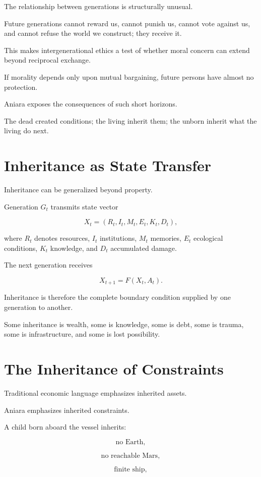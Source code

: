\documentclass[11pt,oneside]{book}
\theoremstyle{definition}
\theoremstyle{remark}
\begin{document}
The relationship between generations is structurally unusual.

Future generations cannot reward us, cannot punish us, cannot vote against us, and cannot refuse the world we construct; they receive it.

This makes intergenerational ethics a test of whether moral concern can extend beyond reciprocal exchange.

If morality depends only upon mutual bargaining, future persons have almost no protection.

Aniara exposes the consequences of such short horizons.

The dead created conditions; the living inherit them; the unborn inherit what the living do next.

\section{Inheritance as State Transfer}

Inheritance can be generalized beyond property.

Generation \(G_t\) transmits state vector

\[
X_t
=
(
R_t,
I_t,
M_t,
E_t,
K_t,
D_t
),
\]

where \(R_t\) denotes resources, \(I_t\) institutions, \(M_t\) memories, \(E_t\) ecological conditions, \(K_t\) knowledge, and \(D_t\) accumulated damage.

The next generation receives

\[
X_{t+1}
=
F(X_t,A_t).
\]

Inheritance is therefore the complete boundary condition supplied by one generation to another.

Some inheritance is wealth, some is knowledge, some is debt, some is trauma, some is infrastructure, and some is lost possibility.

\section{The Inheritance of Constraints}

Traditional economic language emphasizes inherited assets.

Aniara emphasizes inherited constraints.

A child born aboard the vessel inherits:

\[
\text{no Earth},
\]

\[
\text{no reachable Mars},
\]

\[
\text{finite ship},
\]
\end{document}
